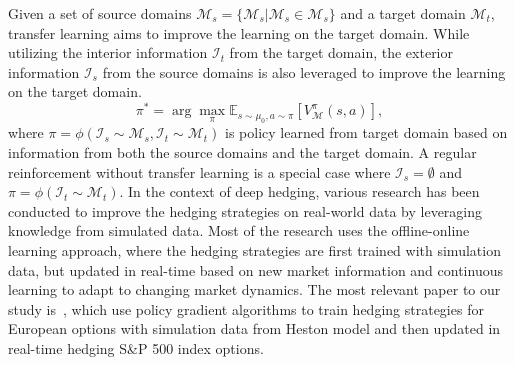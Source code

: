 Given a set of source domains $\bm{\mathcal{M}}_s= \{ \mathcal{M}_s| \mathcal{M}_s \in \bm{\mathcal{M}}_s\}$ and a target domain $\mathcal{M}_t$, transfer learning aims to improve the learning on the target domain.
While utilizing the interior information $\mathcal{I}_t$ from the target domain, the exterior information $\mathcal{I}_s$ from the source domains is also leveraged to improve the learning on the target domain.
\begin{equation}
    \pi^* = \arg \max_\pi \mathbb{E}_{s \sim \mu_0, a \sim \pi} \left[V_{\mathcal{M}}^\pi (s, a) \right], 
\end{equation}
where $\pi = \phi(\mathcal{I}_s \sim \bm{\mathcal{M}}_s, \mathcal{I}_t \sim \mathcal{M}_t)$ is policy learned from target domain based on information from both the source domains and the target domain.
A regular reinforcement without transfer learning is a special case where $\mathcal{I}_s = \emptyset$ and $\pi = \phi(\mathcal{I}_t \sim \mathcal{M}_t)$.
In the context of deep hedging, various research has been conducted to improve the hedging strategies on real-world data by leveraging knowledge from simulated data.
Most of the research uses the offline-online learning approach, where the hedging strategies are first trained with simulation data, but updated in real-time based on new market information and continuous learning to adapt to changing market dynamics.
The most relevant paper to our study is~\cite{xiao2021optimal}, which use policy gradient algorithms to train hedging strategies for European options with simulation data from Heston model and then updated in real-time hedging S\&P 500 index options.

